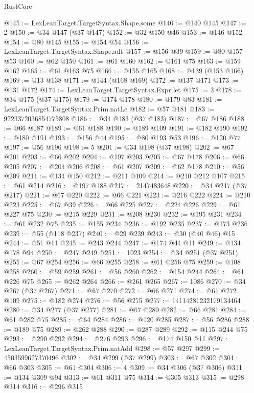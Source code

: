 \begin{lexlean}{RustCore}
\begin{coremodule}
@145 := LexLeanTarget.TargetSyntax.Shape.some
@146 := @140 @145
@147 := 2
@150 := @34 @147 (@37 @147)
@152 := @32 @150 @46
@153 := @146 @152
@154 := @80 @145
@155 := @154 @54
@156 := LexLeanTarget.TargetSyntax.Shape.adt
@157 := @156 @39
@159 := @80 @157 @53
@160 := @62 @150
@161 := @61 @160
@162 := @161 @75
@163 := @159 @162
@165 := @61 @163 @75
@166 := @155 @165
@168 := @139 (@153 @166)
@169 := @13 @138
@171 := @144 (@168 @169)
@172 := @137 @171
@173 := @131 @172
@174 := LexLeanTarget.TargetSyntax.Expr.let
@175 := 3
@178 := @34 @175 (@37 @175)
@179 := @174 @178
@180 := @179 @83
@181 := LexLeanTarget.TargetSyntax.Prim.natLe
@182 := @57 @181
@183 := 9223372036854775808
@186 := @34 @183 (@37 @183)
@187 := @67 @186
@188 := @66 @187
@189 := @61 @188
@190 := @189 @109
@191 := @182 @190
@192 := @180 @191
@193 := @156 @44
@195 := @80 @193 @53
@196 := @120 @77
@197 := @56 @196
@198 := 5
@201 := @34 @198 (@37 @198)
@202 := @67 @201
@203 := @66 @202
@204 := @197 @203
@205 := @67 @178
@206 := @66 @205
@207 := @204 @206
@208 := @61 @207
@209 := @62 @178
@210 := @56 @209
@211 := @134 @150
@212 := @211 @109
@214 := @210 @212 @107
@215 := @61 @214
@216 := @197 @188
@217 := 2147483648
@220 := @34 @217 (@37 @217)
@221 := @67 @220
@222 := @66 @221
@223 := @216 @222
@224 := @210 @223
@225 := @67 @39
@226 := @66 @225
@227 := @224 @226
@229 := @61 @227 @75
@230 := @215 @229
@231 := @208 @230
@232 := @195 @231
@234 := @61 @232 @75
@235 := @155 @234
@236 := @192 @235
@237 := @173 @236
@239 := @55 (@118 @237)
@240 := @29 @239
@243 := @30 (@40 @46) @15
@244 := @51 @11
@245 := @243 @244
@247 := @174 @44 @11
@249 := @134 @178 @94
@250 := @247 @249
@251 := 1023
@254 := @34 @251 (@37 @251)
@255 := @67 @254
@256 := @66 @255
@258 := @61 @256 @75
@259 := @108 @258
@260 := @59 @259
@261 := @56 @260
@262 := @154 @244
@264 := @61 @226 @75
@265 := @262 @264
@266 := @261 @265
@267 := 1086
@270 := @34 @267 (@37 @267)
@271 := @67 @270
@272 := @66 @271
@274 := @61 @272 @109
@275 := @182 @274
@276 := @56 @275
@277 := 14114281232179134464
@280 := @34 @277 (@37 @277)
@281 := @67 @280
@282 := @66 @281
@284 := @61 @282 @75
@285 := @64 @284
@286 := @120 @285
@287 := @56 @286
@288 := @189 @75
@289 := @262 @288
@290 := @287 @289
@292 := @115 @244 @75
@293 := @290 @292
@294 := @276 @293
@296 := @174 @150 @11
@297 := LexLeanTarget.TargetSyntax.Prim.natAdd
@298 := @57 @297
@299 := 4503599627370496
@302 := @34 @299 (@37 @299)
@303 := @67 @302
@304 := @66 @303
@305 := @61 @304
@306 := 4
@309 := @34 @306 (@37 @306)
@311 := @134 @309 @94
@313 := @61 @311 @75
@314 := @305 @313
@315 := @298 @314
@316 := @296 @315

\end{coremodule}
\end{lexlean}
